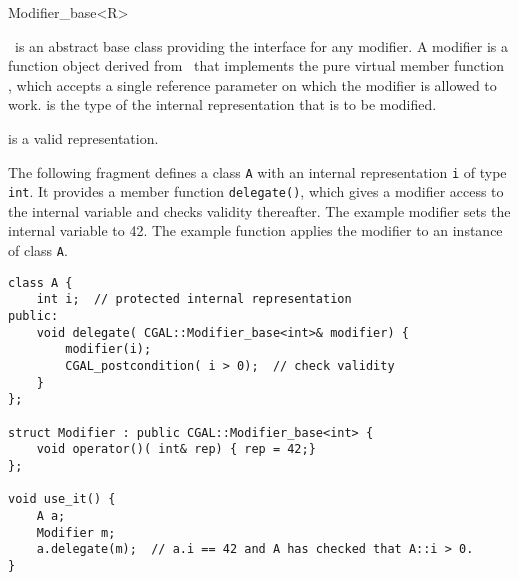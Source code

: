 \begin{ccRefClass}{Modifier_base<R>}
\label{sectionModifierBase}

\ccDefinition

\ccClassTemplateName\ is an abstract base class providing the
interface for any modifier. A modifier is a function object derived
from \ccClassTemplateName\ that implements the pure virtual member
function , which accepts a single reference parameter
 on which the modifier is allowed to work.   is the
type of the internal representation that is to be modified.


\ccTypes
{}
\ccThreeToTwo


\ccOperations
{}

\ccTagFullDeclarations
{}
    {\ccPostcond {} is a valid representation.}
\ccTagDefaults

\ccExample

The following fragment defines a class {\tt A} with an internal
representation {\tt i} of type {\tt int}. It provides a member
function {\tt delegate()}, which gives a modifier access to the
internal variable and checks validity thereafter.  The
example modifier sets the internal variable to 42. The example
function applies the modifier to an instance of class {\tt A}.

\begin{verbatim}
class A {
    int i;  // protected internal representation
public:
    void delegate( CGAL::Modifier_base<int>& modifier) {
        modifier(i);
        CGAL_postcondition( i > 0);  // check validity
    }
};

struct Modifier : public CGAL::Modifier_base<int> {
    void operator()( int& rep) { rep = 42;}
};

void use_it() {
    A a;
    Modifier m;
    a.delegate(m);  // a.i == 42 and A has checked that A::i > 0.
}
\end{verbatim}

\end{ccRefClass}

